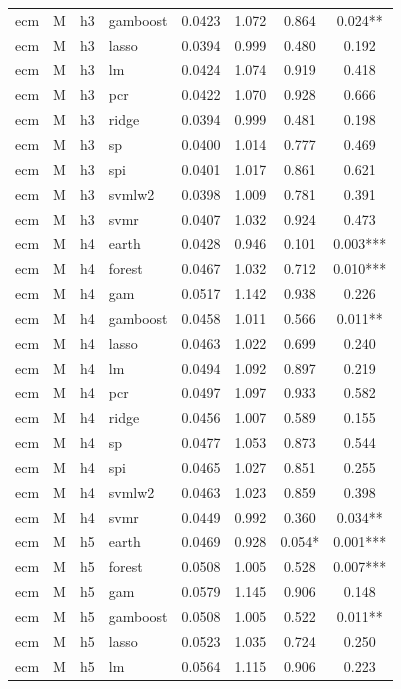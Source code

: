 \begin{ThreePartTable}
\begin{longtable}[t]{llclcccc}
ecm & M & h3 & gamboost & 0.0423 & 1.072 & 0.864 & 0.024**\\
ecm & M & h3 & lasso & 0.0394 & 0.999 & 0.480 & 0.192\\
ecm & M & h3 & lm & 0.0424 & 1.074 & 0.919 & 0.418\\
ecm & M & h3 & pcr & 0.0422 & 1.070 & 0.928 & 0.666\\
ecm & M & h3 & ridge & 0.0394 & 0.999 & 0.481 & 0.198\\
ecm & M & h3 & sp & 0.0400 & 1.014 & 0.777 & 0.469\\
ecm & M & h3 & spi & 0.0401 & 1.017 & 0.861 & 0.621\\
ecm & M & h3 & svmlw2 & 0.0398 & 1.009 & 0.781 & 0.391\\
ecm & M & h3 & svmr & 0.0407 & 1.032 & 0.924 & 0.473\\
\addlinespace
ecm & M & h4 & earth & 0.0428 & 0.946 & 0.101 & 0.003***\\
ecm & M & h4 & forest & 0.0467 & 1.032 & 0.712 & 0.010***\\
ecm & M & h4 & gam & 0.0517 & 1.142 & 0.938 & 0.226\\
ecm & M & h4 & gamboost & 0.0458 & 1.011 & 0.566 & 0.011**\\
ecm & M & h4 & lasso & 0.0463 & 1.022 & 0.699 & 0.240\\
ecm & M & h4 & lm & 0.0494 & 1.092 & 0.897 & 0.219\\
ecm & M & h4 & pcr & 0.0497 & 1.097 & 0.933 & 0.582\\
ecm & M & h4 & ridge & 0.0456 & 1.007 & 0.589 & 0.155\\
ecm & M & h4 & sp & 0.0477 & 1.053 & 0.873 & 0.544\\
ecm & M & h4 & spi & 0.0465 & 1.027 & 0.851 & 0.255\\
ecm & M & h4 & svmlw2 & 0.0463 & 1.023 & 0.859 & 0.398\\
ecm & M & h4 & svmr & 0.0449 & 0.992 & 0.360 & 0.034**\\
\addlinespace
ecm & M & h5 & earth & 0.0469 & 0.928 & 0.054* & 0.001***\\
ecm & M & h5 & forest & 0.0508 & 1.005 & 0.528 & 0.007***\\
ecm & M & h5 & gam & 0.0579 & 1.145 & 0.906 & 0.148\\
ecm & M & h5 & gamboost & 0.0508 & 1.005 & 0.522 & 0.011**\\
ecm & M & h5 & lasso & 0.0523 & 1.035 & 0.724 & 0.250\\
ecm & M & h5 & lm & 0.0564 & 1.115 & 0.906 & 0.223\\

\end{longtable}
\end{ThreePartTable}
